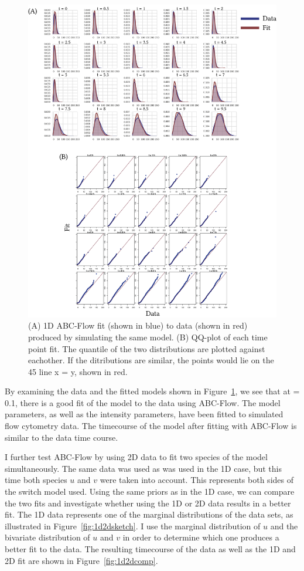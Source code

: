 \begin{figure}[htbp]
\centering
	\includegraphics[scale=0.8]{../../chapters/chapterABCFlow/images/1D_sim_res.png}
	\caption[LoF caption]{\label{fig:1d-sim-res} (A) 1D ABC-Flow fit (shown in blue) to data (shown in red) produced by simulating the same model. (B) QQ-plot of each time point fit. The quantile of the two distributions are plotted against eachother. If the ditributions are similar, the points would lie on the 45\textdegree{} line x = y, shown in red. }
\end{figure}
\clearpage

By examining the data and the fitted models shown in Figure~\ref{fig:1d-sim-res}, we see that at \textepsilon = 0.1, there is a good fit of the model to the data using ABC-Flow. The model parameters, as well as the intensity parameters, have been fitted to simulated flow cytometry data. The timecourse of the model after fitting with ABC-Flow is similar to the data time course. 

I further test ABC-Flow by using 2D data to fit two species of the model simultaneously. The same data was used as was used in the 1D case, but this time both species $u$ and $v$ were taken into account. This represents both sides of the switch model used. Using the same priors as in the 1D case, we can compare the two fits and investigate whether using the 1D or 2D data results in a better fit. The 1D data represents one of the marginal distributions of the data sets, as illustrated in Figure~\ref{fig:1d2dsketch}. I use the marginal distribution of $u$ and the bivariate distribution of $u$ and $v$ in order to determine which one produces a better fit to the data. The resulting timecourse of the data as well as the 1D and 2D fit are shown in Figure~\ref{fig:1d2dcomp}.


